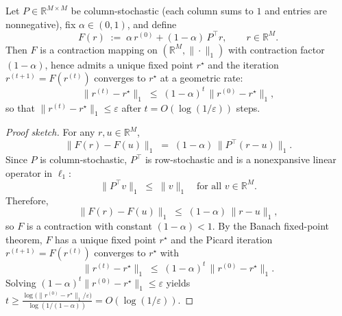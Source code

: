\documentclass[10pt,a4paper]{amsart}
\begin{document}
\begin{proposition}
Let $P \in \mathbb{R}^{M\times M}$ be column-stochastic (each column sums to $1$ and entries are nonnegative), fix $\alpha \in (0,1)$, and define
\[
F(r)\;:=\; \alpha\, r^{(0)} + (1-\alpha)\, P^\top r, 
\qquad r \in \mathbb{R}^M.
\]
Then $F$ is a contraction mapping on $(\mathbb{R}^M,\|\cdot\|_1)$ with contraction factor $(1-\alpha)$, hence admits a unique fixed point $r^\star$ and the iteration $r^{(t+1)}=F(r^{(t)})$ converges to $r^\star$ at a geometric rate:
\[
\|r^{(t)}-r^\star\|_1 \;\le\; (1-\alpha)^t \,\|r^{(0)}-r^\star\|_1,
\]
so that $\|r^{(t)}-r^\star\|_1 \le \varepsilon$ after $t = O(\log(1/\varepsilon))$ steps.
\end{proposition}

\begin{proof}[Proof sketch]
For any $r,u \in \mathbb{R}^M$,
\[
\|F(r)-F(u)\|_1 \;=\; (1-\alpha)\,\|P^\top(r-u)\|_1.
\]
Since $P$ is column-stochastic, $P^\top$ is row-stochastic and is a nonexpansive linear operator in $\ell_1$:
\[
\|P^\top v\|_1 \;\le\; \|v\|_1 \quad \text{for all } v\in\mathbb{R}^M.
\]
Therefore,
\[
\|F(r)-F(u)\|_1 \;\le\; (1-\alpha)\,\|r-u\|_1,
\]
so $F$ is a contraction with constant $(1-\alpha)<1$. By the Banach fixed-point theorem, $F$ has a unique fixed point $r^\star$ and the Picard iteration $r^{(t+1)}=F(r^{(t)})$ converges to $r^\star$ with
\[
\|r^{(t)}-r^\star\|_1 \;\le\; (1-\alpha)^t \,\|r^{(0)}-r^\star\|_1.
\]
Solving $(1-\alpha)^t \|r^{(0)}-r^\star\|_1 \le \varepsilon$ yields 
$t \ge \frac{\log\!\big(\|r^{(0)}-r^\star\|_1/\varepsilon\big)}{\log(1/(1-\alpha))} = O(\log(1/\varepsilon))$.
\end{proof}
\end{document}
